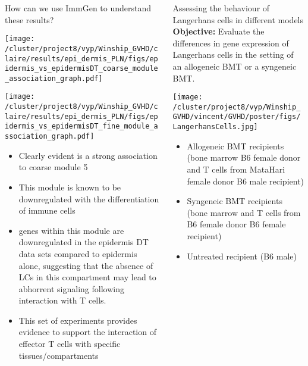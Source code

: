 \documentclass[final,hyperref={pdfpagelabels=false}]{beamer}
\begin{document}
\begin{frame}{}
\begin{columns}[t]
\begin{column}{.36\linewidth}
\begin{block}{How can we use ImmGen to understand these results?}
	  \begin{minipage}{0.45\textwidth}
	    \texttt{[image: /cluster/project8/vyp/Winship\_GVHD/claire/results/epi\_dermis\_PLN/figs/epidermis\_vs\_epidermisDT\_coarse\_module\_association\_graph.pdf]}
	  \end{minipage}
\hfill
\begin{minipage}{0.45\textwidth}
  \texttt{[image: /cluster/project8/vyp/Winship\_GVHD/claire/results/epi\_dermis\_PLN/figs/epidermis\_vs\_epidermisDT\_fine\_module\_association\_graph.pdf]}
\end{minipage}
\hfill
    {\small	  \begin{itemize}
      \item Clearly evident is a strong association to coarse module 5
      \item This module is known to be downregulated with the differentiation of immune cells
      \item genes within this module are downregulated in the epidermis DT data sets compared to epidermis alone, suggesting that the absence of LCs in this compartment may lead to abhorrent signaling following interaction with T cells. 
      \item This set of experiments provides evidence to support the interaction of effector T cells with specific tissues/compartments 
    \end{itemize}}
        \end{block}
\end{column}

      \begin{column}{.36\linewidth}


        \begin{block}{Assessing the behaviour of Langerhans cells in different models}
	  {\bf Objective:} Evaluate the differences in gene expression of Langerhans cells in the setting of an allogeneic BMT or a syngeneic BMT. 


	  \begin{minipage}{20cm}
	   \texttt{[image: /cluster/project8/vyp/Winship\_GVHD/vincent/GVHD/poster/figs/LangerhansCells.jpg]}
            \end{minipage}
	  \begin{minipage}{20cm}
	    \begin{itemize}
	    \item Allogeneic BMT recipients (bone marrow B6 female donor and T cells from MataHari female donor B6 male recipient)
	    \item Syngeneic BMT recipients (bone marrow and T cells from B6 female donor  B6 female recipient)
	    \item Untreated recipient (B6 male)
	    \end{itemize}
            \end{minipage}



\end{block}
\end{column}
\end{columns}
\end{frame}
\end{document}

